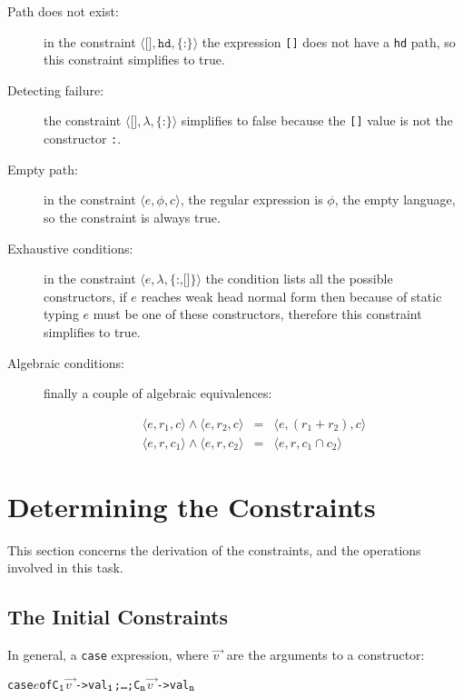 \documentclass[book]{tfp05symp}
\newcommand{\T}[1]{\texttt{#1}}
\newcommand{\tup}[1]{\ensuremath{\langle #1 \rangle}}
\renewcommand{\c}[3]{\tup{\T{#1},\T{#2},\T{\{#3\}}}}
\newcommand{\cc}[2]{\c{#1}{$\lambda$}{#2}}
\newcommand{\s}[1]{\ensuremath{_{\tt #1}}}
\newcommand{\vecto}[1]{\overrightarrow{#1\;}}
\newenvironment{code}{\begin{alltt}\small}{\end{alltt}}
\begin{document}
\begin{description}

\item[Path does not exist:] in the constraint \c{[]}{hd}{:} the expression
\T{[]} does not have a \T{hd} path, so this constraint simplifies
to true.

\item[Detecting failure:] the constraint \cc{[]}{:} simplifies to false
because the \T{[]} value is not the constructor \T{:}.

\item[Empty path:] in the constraint $\tup{e,\phi,c}$, the
regular expression is $\phi$, the empty language, so the constraint
is always true.

\item[Exhaustive conditions:] in the constraint \cc{$e$}{:,[]}
the condition lists all the possible constructors, if $e$ reaches
weak head normal form then because of static typing $e$ must be one
of these constructors, therefore this constraint simplifies to true.

\item[Algebraic conditions:] finally a couple of algebraic equivalences:

\[
\begin{array}{rcl}
\tup{e,r_1,c} \wedge \tup{e,r_2,c} & = & \tup{e,(r_1+r_2),c} \\
\tup{e,r,c_1} \wedge \tup{e,r,c_2} & = & \tup{e,r,c_1 \cap c_2}
\end{array}
\]
\end{description}


\section{Determining the Constraints}
\label{sec:determining}

This section concerns the derivation of the constraints, and the
operations involved in this task.

\subsection{The Initial Constraints}

In general, a \T{case} expression, where $\vecto{v}$ are the
arguments to a constructor:

\begin{code}
case \(e\) of {C\s{1} \(\vecto{v}\) -> val\s{1}; \ldots; C\s{n} \(\vecto{v}\) -> val\s{n}}
\end{code}
\end{document}
